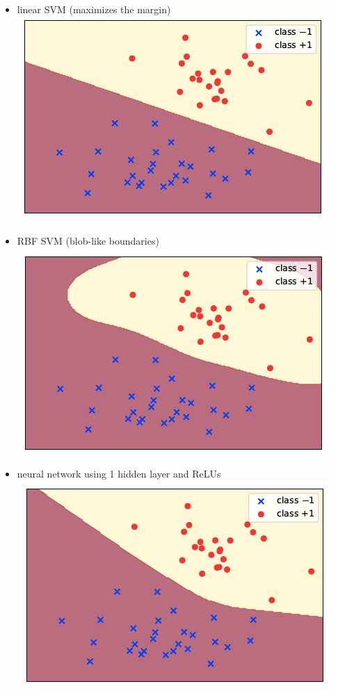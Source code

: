 \documentclass[10pt,landscape,a4paper]{article}
\begin{document}
\begin{multicols*}{5}
\begin{itemize}
    \item linear SVM (maximizes the margin)\\
    \includegraphics[scale=0.3]{linear_svm_plot}
    \item RBF SVM (blob-like boundaries) \\
    \includegraphics[scale=0.3]{rbf_svm_plot}
    \item neural network using 1 hidden layer and ReLUs \\
    \includegraphics[scale=0.28]{neural_network_plot}

\end{itemize}
\end{multicols*}
\end{document}
